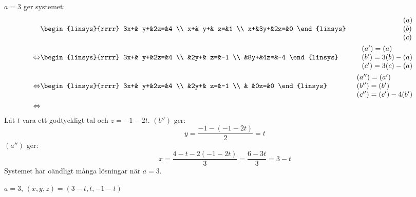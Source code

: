 \begin{task}{1.18}
	$a=3$ ger systemet:
	\begin{align*}
		&\begin{linsys}{rrrr}
			3x+& y+&2z=&4 \\
			 x+& y+& z=&1 \\
			 x+&3y+&2z=&0
		\end{linsys}
		&\begin{array}{l} 
			(a) \\ 
			(b) \\
			(c)
		\end{array} \\ \lra
		&\begin{linsys}{rrrr}
			3x+& y+&2z=&4 \\
			   &2y+& z=&-1 \\
			   &8y+&4z=&-4
		\end{linsys}
		&\begin{array}{l} 
			(a')=(a) \\ 
			(b')=3(b)-(a) \\
			(c')=3(c)-(a)
		\end{array} \\ \lra
		&\begin{linsys}{rrrr}
			3x+& y+&2z=&4 \\
			   &2y+& z=&-1 \\
			   &   &0z=&0
		\end{linsys}
		&\begin{array}{l} 
			(a'')=(a') \\ 
			(b'')=(b') \\
			(c'')=(c')-4(b')
		\end{array} \\ \lra
	\end{align*}
	Låt $t$ vara ett godtyckligt tal och $z=-1-2t$.
	$(b'')$ ger:
	\[y=\frac{-1-(-1-2t)}{2}=t\]
	$(a'')$ ger:
	\[x=\frac{4-t-2(-1-2t)}{3}=\frac{6-3t}{3}=3-t\]
	Systemet har oändligt många lösningar när $a=3$.

	\ans $a=3$, $(x,y,z)=(3-t,t,-1-t)$
\end{task}

